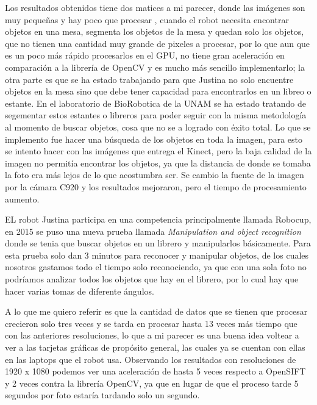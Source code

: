  
 Los resultados obtenidos tiene dos matices a mi parecer, donde las imágenes son muy pequeñas y hay poco que procesar , cuando el robot necesita encontrar objetos en una mesa, segmenta los objetos de la mesa y quedan solo los objetos, que no tienen una cantidad muy grande de pixeles a procesar, por lo que aun que es un poco más rápido procesarlos en el GPU, no tiene gran aceleración en comparación a la librería de OpenCV y es mucho más sencillo implementarlo; la otra parte es que se ha estado trabajando para que Justina no solo encuentre objetos en la mesa sino que debe tener capacidad para encontrarlos en un libreo o estante. En el laboratorio de BioRobotica de la UNAM  se ha estado tratando de segementar estos estantes o libreros para poder seguir con la misma metodología al momento de buscar objetos, cosa que no se a logrado con éxito total. Lo que se implemento fue hacer una búsqueda de los objetos en toda la imagen, para esto se intento hacer con las imágenes que entrega el Kinect, pero la baja calidad de la imagen no permitía encontrar los objetos, ya que la distancia de donde se tomaba la foto era más lejos de lo que acostumbra ser.
 Se cambio la fuente de la imagen por la cámara C920 y los resultados mejoraron, pero el tiempo de procesamiento aumento.

EL robot Justina participa en una competencia principalmente llamada Robocup, en 2015 se puso una nueva prueba llamada  \textit{Manipulation and object recognition} donde se tenia que buscar objetos en un librero y manipularlos básicamente. Para esta prueba solo dan 3 minutos para reconocer y manipular objetos,  de los cuales nosotros gastamos todo el tiempo solo reconociendo, ya que con una sola foto no podríamos analizar todos los objetos que  hay en el librero, por lo cual hay que hacer varias tomas de diferente ángulos.


 
 A lo que me quiero referir es que la cantidad de datos que se tienen que procesar crecieron solo tres veces y se tarda en procesar hasta 13 veces más tiempo que con las anteriores resoluciones, lo que a mi parecer es una buena idea voltear a ver a las tarjetas gráficas de propósito general, las cuales ya se cuentan con ellas en las laptops que el robot usa. Observando los resultados con resoluciones de 1920 x 1080 podemos ver una aceleración de hasta 5 veces respecto a OpenSIFT y 2 veces contra la librería OpenCV, ya que en lugar de que el proceso tarde 5 segundos por foto estaría tardando solo un segundo.  
 
  

\nocite{AI Shack}



 
 
 
 
 
 
 
 
 

